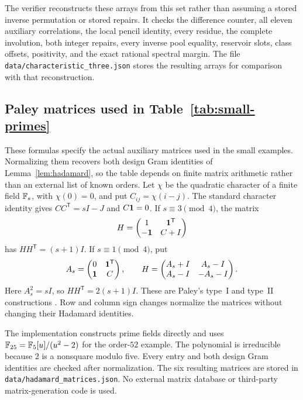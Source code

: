 The verifier reconstructs these arrays from this set rather than assuming a stored inverse permutation or stored repairs. It checks the difference counter, all eleven auxiliary correlations, the local pencil identity, every residue, the complete involution, both integer repairs, every inverse pool equality, reservoir slots, class offsets, positivity, and the exact rational spectral margin. The file \texttt{data/characteristic\_three.json} stores the resulting arrays for comparison with that reconstruction.

\subsection{Paley matrices used in Table~\ref{tab:small-primes}}

These formulas specify the actual auxiliary matrices used in the small examples. Normalizing them recovers both design Gram identities of Lemma~\ref{lem:hadamard}, so the table depends on finite matrix arithmetic rather than an external list of known orders.
Let $\chi$ be the quadratic character of a finite field $\mathbb F_s$, with $\chi(0)=0$, and put $C_{ij}=\chi(i-j)$. The standard character identity gives $CC^{\mathsf T}=sI-J$ and $C\mathbf1=0$. If $s\equiv3\pmod4$, the matrix
\[
 H=\begin{pmatrix}1&\mathbf1^{\mathsf T}\\-\mathbf1&C+I\end{pmatrix}
\]
has $HH^{\mathsf T}=(s+1)I$. If $s\equiv1\pmod4$, put
\[
 A_s=\begin{pmatrix}0&\mathbf1^{\mathsf T}\\\mathbf1&C\end{pmatrix},
 \qquad
 H=\begin{pmatrix}A_s+I&A_s-I\\A_s-I&-A_s-I\end{pmatrix}.
\]
Here $A_s^2=sI$, so $HH^{\mathsf T}=2(s+1)I$. These are Paley's type~I and type~II constructions \cite{Pal33}. Row and column sign changes normalize the matrices without changing their Hadamard identities.

The implementation constructs prime fields directly and uses $\mathbb F_{25}=\mathbb F_5[u]/(u^2-2)$ for the order-$52$ example. The polynomial is irreducible because $2$ is a nonsquare modulo five. Every entry and both design Gram identities are checked after normalization. The six resulting matrices are stored in \texttt{data/hadamard\_matrices.json}. No external matrix database or third-party matrix-generation code is used.

